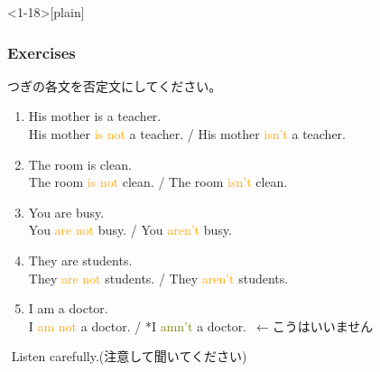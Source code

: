 \documentclass[aspectratio=169]{beamer}
\newcommand{\myaudio}[1]{\href{#1}{\faVolumeUp}}
\begin{document}
\begin{frame}<1-18>[plain]\frametitle{Exercises}
つぎの各文を否定文にしてください。


  \begin{enumerate}
   \item His mother is a teacher.\\
         \pause
         His mother \textcolor{orange}{is not} a teacher. \pause{}/ His mother \textcolor{orange}{isn't} a teacher.\pause
   \item The room is clean.\\
         \pause
         The room \textcolor{orange}{is not} clean. \pause{}/ The room \textcolor{orange}{isn't} clean.\pause
   \item You are busy.\\
         \pause
         You \textcolor{orange}{are not} busy. \pause{}/ You \textcolor{orange}{aren't} busy.\pause
   \item They are students.\\
         \pause
         They \textcolor{orange}{are not} students. \pause{}/ They \textcolor{orange}{aren't} students.
   \item I am a doctor.\\
         \pause
         I \textcolor{orange}{am not} a doctor. \pause{} / *I \textcolor{olive}{amn't} a doctor.\,\,\,{}$\longleftarrow$こうはいいません\pause
  \end{enumerate}



\myaudio{audio/006_negative_be_01.mp3}\,\,{}Listen carefully.(注意して聞いてください)
\end{frame}
\end{document}

